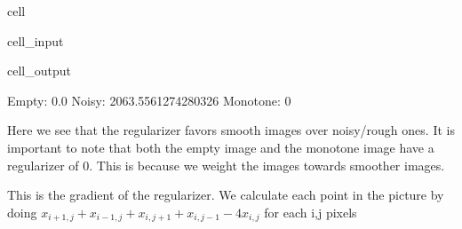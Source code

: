 \documentclass[letterpaper,10pt,english]{jupyterBook}
\begin{document}
\begin{sphinxuseclass}{cell}\begin{sphinxVerbatimInput}

\begin{sphinxuseclass}{cell_input}
\begin{sphinxVerbatim}[commandchars=\\\{\}]
\end{sphinxVerbatim}

\end{sphinxuseclass}\end{sphinxVerbatimInput}
\begin{sphinxVerbatimOutput}

\begin{sphinxuseclass}{cell_output}
\begin{sphinxVerbatim}[commandchars=\\\{\}]
Empty: \PYGZhy{}0.0
Noisy: \PYGZhy{}2063.5561274280326
Monotone: 0
\end{sphinxVerbatim}

\end{sphinxuseclass}\end{sphinxVerbatimOutput}

\end{sphinxuseclass}
\sphinxAtStartPar
Here we see that the regularizer favors smooth images over noisy/rough ones. It is important to note that both the empty image and the monotone image have a regularizer of 0. This is because we weight the images towards smoother images.

\sphinxAtStartPar
This is the gradient of the regularizer.
We calculate each point in the picture by doing \(x_{i+1,j} + x_{i-1,j} + x_{i,j+1} + x_{i,j-1} - 4x_{i,j}\) for each i,j pixels
\end{document}
